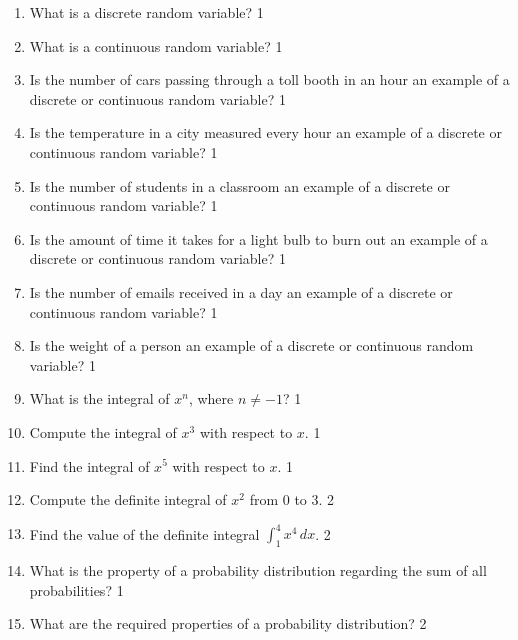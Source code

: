 \documentclass[a4paper,oneside, margin=1.4in]{book}
\begin{document}
  \begin{enumerate}

\item What is a discrete random variable? \hfill 1

\item What is a continuous random variable? \hfill 1

\item Is the number of cars passing through a toll booth in an hour an example of a discrete or continuous random variable? \hfill 1

\item Is the temperature in a city measured every hour an example of a discrete or continuous random variable? \hfill 1

\item Is the number of students in a classroom an example of a discrete or continuous random variable? \hfill 1

\item Is the amount of time it takes for a light bulb to burn out an example of a discrete or continuous random variable? \hfill 1

\item Is the number of emails received in a day an example of a discrete or continuous random variable? \hfill 1

\item Is the weight of a person an example of a discrete or continuous random variable? \hfill 1

\item What is the integral of \( x^n \), where \( n \neq -1 \)? \hfill 1

\item Compute the integral of \( x^3 \) with respect to \( x \). \hfill 1

\item Find the integral of \( x^5 \) with respect to \( x \). \hfill 1

\item Compute the definite integral of \( x^2 \) from 0 to 3. \hfill 2

\item Find the value of the definite integral \( \int_1^4 x^4 \, dx \). \hfill 2

\item What is the property of a probability distribution regarding the sum of all probabilities? \hfill 1

\item What are the required properties of a probability distribution? \hfill 2


\end{enumerate}
\end{document}
